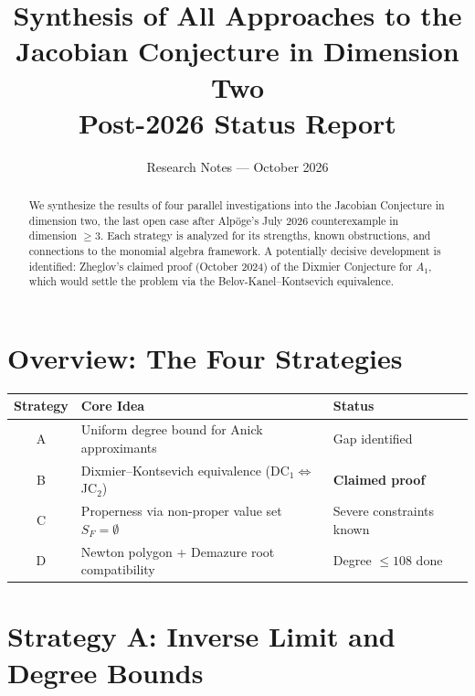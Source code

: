 \documentclass[12pt,a4paper]{article}
\title{Synthesis of All Approaches to the\\
Jacobian Conjecture in Dimension Two\\[6pt]
\large Post-2026 Status Report}
\author{Research Notes --- October 2026}
\date{}
\theoremstyle{definition}
\begin{document}
\maketitle

\begin{abstract}
We synthesize the results of four parallel investigations into the Jacobian
Conjecture in dimension two, the last open case after Alp\"oge's July 2026
counterexample in dimension $\geq 3$. Each strategy is analyzed for its
strengths, known obstructions, and connections to the monomial algebra framework.
A potentially decisive development is identified: Zheglov's claimed proof
(October 2024) of the Dixmier Conjecture for $A_1$, which would settle the
problem via the Belov-Kanel--Kontsevich equivalence.
\end{abstract}

\tableofcontents

\section{Overview: The Four Strategies}

\begin{center}
\renewcommand{\arraystretch}{1.4}
\begin{tabular}{|c|l|l|}
\hline
\textbf{Strategy} & \textbf{Core Idea} & \textbf{Status} \\
\hline
A & Uniform degree bound for Anick approximants & Gap identified \\
B & Dixmier--Kontsevich equivalence (DC$_1 \Leftrightarrow$ JC$_2$) & \textbf{Claimed proof} \\
C & Properness via non-proper value set $S_F = \emptyset$ & Severe constraints known \\
D & Newton polygon + Demazure root compatibility & Degree $\leq 108$ done \\
\hline
\end{tabular}
\end{center}

\section{Strategy A: Inverse Limit and Degree Bounds}
\end{document}
